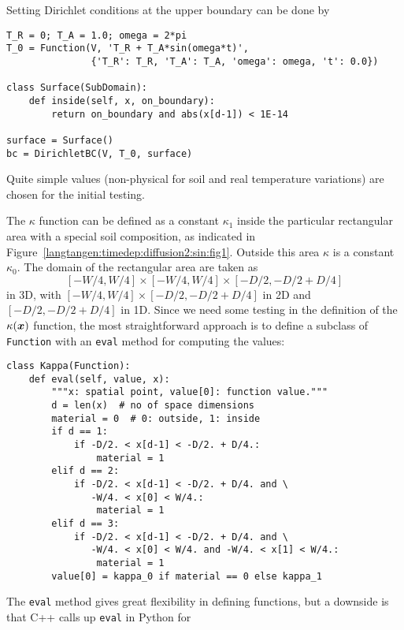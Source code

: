 Setting Dirichlet conditions at the upper boundary can be done by
\begin{Verbatim}[fontsize=\fontsize{10pt}{10pt},tabsize=8,baselinestretch=1.05,
fontfamily=tt,xleftmargin=7mm]
T_R = 0; T_A = 1.0; omega = 2*pi
T_0 = Function(V, 'T_R + T_A*sin(omega*t)',
               {'T_R': T_R, 'T_A': T_A, 'omega': omega, 't': 0.0})

class Surface(SubDomain):
    def inside(self, x, on_boundary):
        return on_boundary and abs(x[d-1]) < 1E-14

surface = Surface()
bc = DirichletBC(V, T_0, surface)
\end{Verbatim}
\noindent
Quite simple values (non-physical for soil and real temperature variations)
are chosen for the initial testing.

The $\kappa$ function can be defined as a constant $\kappa_1$ inside
the particular rectangular area with a special soil composition, as
indicated in Figure~\ref{langtangen:timedep:diffusion2:sin:fig1}. Outside
this area $\kappa$ is a constant $\kappa_0$.
The domain of the rectangular area are taken as 
\[ [-W/4, W/4]\times [-W/4, W/4]\times [-D/2, -D/2 + D/4]\]
in 3D, with $[-W/4, W/4]\times [-D/2, -D/2 + D/4]$ in 2D and
$[-D/2, -D/2 + D/4]$ in 1D.
Since we need some testing in the definition of the $\kappa({\mbox{\boldmath $x$}})$
function, the most straightforward approach is to define a subclass
of {\fontsize{12pt}{12pt}\texttt{Function}}
with an {\fontsize{12pt}{12pt}\texttt{eval}} method for computing the values:
\begin{Verbatim}[fontsize=\fontsize{10pt}{10pt},tabsize=8,baselinestretch=1.05,
fontfamily=tt,xleftmargin=7mm]
class Kappa(Function):
    def eval(self, value, x):
        """x: spatial point, value[0]: function value."""
        d = len(x)  # no of space dimensions
        material = 0  # 0: outside, 1: inside
        if d == 1:
            if -D/2. < x[d-1] < -D/2. + D/4.:
                material = 1
        elif d == 2:
            if -D/2. < x[d-1] < -D/2. + D/4. and \
               -W/4. < x[0] < W/4.:
                material = 1
        elif d == 3:
            if -D/2. < x[d-1] < -D/2. + D/4. and \
               -W/4. < x[0] < W/4. and -W/4. < x[1] < W/4.:
                material = 1
        value[0] = kappa_0 if material == 0 else kappa_1
\end{Verbatim}
\noindent
The {\fontsize{12pt}{12pt}\texttt{eval}} method gives great flexibility in defining functions,
but a downside is that C++ calls up {\fontsize{12pt}{12pt}\texttt{eval}} in Python for 
